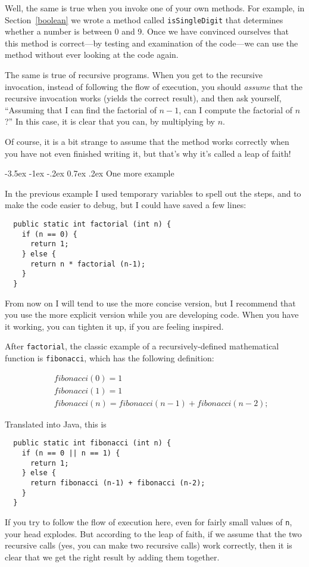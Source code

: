 \documentclass{book}
\makeatletter
\renewcommand{\section}{\@startsection 
    {section} {1} {0mm}%
    {-3.5ex \@plus -1ex \@minus -.2ex}%
    {0.7ex \@plus.2ex}%
    {\normalfont\Large\bfseries}}
\makeatother
\begin{document}
Well, the same is true when you invoke one of your own methods.
For example, in Section~\ref{boolean} we wrote a method called
{\tt isSingleDigit} that determines whether a number is between
0 and 9.  Once we have convinced ourselves that this method
is correct---by testing and examination of the code---we can
use the method without ever looking at the code again.

The same is true of recursive programs.  When you get to
the recursive invocation, instead of following the flow of
execution, you should {\em assume} that the recursive invocation
works (yields the correct result), and then ask yourself,
``Assuming that I can find the factorial of $n-1$, can I
compute the factorial of $n$?''  In this case, it is clear
that you can, by multiplying by $n$.

Of course, it is a bit strange to assume that the method
works correctly when you have not even finished writing it,
but that's why it's called a leap of faith!

\section{One more example}
\label{factorial}

In the previous example I used temporary variables to spell out the
steps, and to make the code easier to debug, but I could have saved a
few lines:

\begin{verbatim}
  public static int factorial (int n) {
    if (n == 0) {
      return 1;
    } else {
      return n * factorial (n-1);
    }
  }
\end{verbatim}
%
From now on I will tend to use the more concise version, but
I recommend that you use the more explicit version while you
are developing code.   When you have it working, you can
tighten it up, if you are feeling inspired.

After {\tt factorial}, the classic example of a recursively-defined
mathematical function is {\tt fibonacci}, which has the
following definition:

\begin{eqnarray*}
&& fibonacci(0) = 1 \\
&& fibonacci(1) = 1 \\
&& fibonacci(n) = fibonacci(n-1) + fibonacci(n-2);
\end{eqnarray*}

Translated into Java, this is

\begin{verbatim}
  public static int fibonacci (int n) {
    if (n == 0 || n == 1) {
      return 1;
    } else {
      return fibonacci (n-1) + fibonacci (n-2);
    }
  }
\end{verbatim}
%
If you try to follow the flow of execution here, even for fairly small
values of {\tt n}, your head explodes.  But according to the leap of
faith, if we assume that the two recursive calls (yes, you can make
two recursive calls) work correctly, then it is clear that we get the
right result by adding them together.
\end{document}
